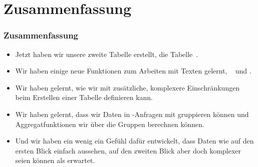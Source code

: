 \documentclass[aspectratio=169,mathserif,notheorems]{beamer}%
\begin{document}
\section{Zusammenfassung}%
%
\begin{frame}%
\frametitle{Zusammenfassung}%
\begin{itemize}%
\item Jetzt haben wir unsere zweite Tabelle erstellt, die Tabelle~.%
\item<2-> Wir haben einige neue Funktionen zum Arbeiten mit Texten gelernt, \DEzB~ und .%
\item<3-> Wir haben gelernt, wie wir mit  zusätzliche, komplexere Einschränkungen beim Erstellen einer Tabelle definieren kann.%
\item<4-> Wir haben gelernt, dass wir Daten in -Anfragen mit  gruppieren können und Aggregatfunktionen wir  über die Gruppen berechnen können.%
\item<5-> Und wir haben ein wenig ein Gefühl dafür entwickelt, dass Daten wie  auf den ersten Blick einfach aussehen, auf den zweiten Blick aber doch komplexer seien können als erwartet.%
\end{itemize}%
\end{frame}%
%
\endPresentation%
\end{document}
